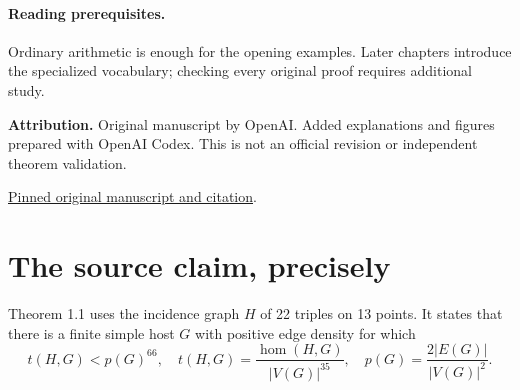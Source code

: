 \documentclass[11pt]{article}
\begin{document}
\paragraph{Reading prerequisites.} Ordinary arithmetic is enough for the opening examples. Later chapters introduce the specialized vocabulary; checking every original proof requires additional study.\par\textbf{Attribution.} Original manuscript by OpenAI. Added explanations and figures prepared with OpenAI Codex. This is not an official revision or independent theorem validation.\par\href{https://github.com/openai/math/tree/1581d4cbdd69a0faf34b2089614fe2a814316a6a/preprints/A-counterexample-to-Sidorenkos-conjecture-September-23-2026}{Pinned original manuscript and citation}.\newpage\section*{The source claim, precisely}Theorem 1.1 uses the incidence graph $H$ of 22 triples on 13 points. It states that there is a finite simple host $G$ with positive edge density for which
\[t(H,G)<p(G)^{66},\quad t(H,G)=\frac{\operatorname{hom}(H,G)}{|V(G)|^{35}},\quad p(G)=\frac{2|E(G)|}{|V(G)|^2}.\]
\end{document}
